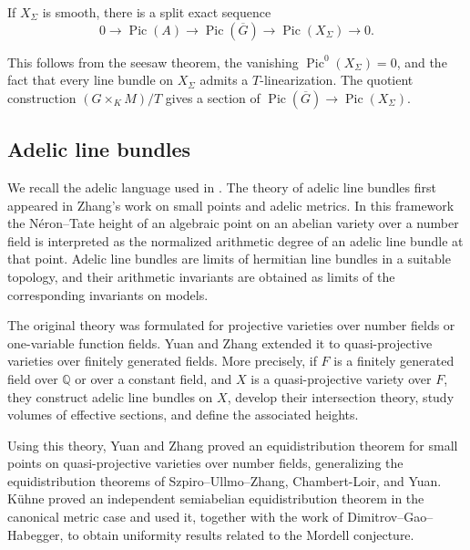 \documentclass[10pt,a4paper]{amsart}
\theoremstyle{plain}
\theoremstyle{plain}
\numberwithin{equation}{section}
\begin{document}
\begin{prop}
	If \(X_\Sigma\) is smooth, there is a split exact sequence
	\[
	0\longrightarrow \operatorname{Pic}(A)
	\longrightarrow \operatorname{Pic}(\overline G)
	\longrightarrow \operatorname{Pic}(X_\Sigma)
	\longrightarrow 0.
	\]
\end{prop}
This follows from the seesaw theorem, the vanishing
\(\operatorname{Pic}^0(X_\Sigma)=0\), and the fact that every line bundle on
\(X_\Sigma\) admits a \(T\)-linearization.  The quotient construction
\((G\times_K M)/T\) gives a section of
\(\operatorname{Pic}(\overline G)\to\operatorname{Pic}(X_\Sigma)\).
\subsection{Adelic line bundles}


We recall the adelic language used in \cite{YZ}.  The theory of adelic line
bundles first appeared in Zhang's work on small points and adelic metrics.  In
this framework the N\'eron--Tate height of an algebraic point on an abelian
variety over a number field is interpreted as the normalized arithmetic degree
of an adelic line bundle at that point.  Adelic line bundles are limits of
hermitian line bundles in a suitable topology, and their arithmetic invariants
are obtained as limits of the corresponding invariants on models.

The original theory was formulated for projective varieties over number fields
or one-variable function fields.  Yuan and Zhang extended it to
quasi-projective varieties over finitely generated fields.  More precisely, if
\(F\) is a finitely generated field over \(\mathbb Q\) or over a constant
field, and \(X\) is a quasi-projective variety over \(F\), they construct
adelic line bundles on \(X\), develop their intersection theory, study volumes
of effective sections, and define the associated heights.


Using this theory, Yuan and Zhang proved an equidistribution theorem for small points on quasi-projective varieties over number fields, generalizing the equidistribution theorems of Szpiro--Ullmo--Zhang, Chambert-Loir, and Yuan.  K\"uhne proved an independent semiabelian equidistribution theorem in the canonical metric case and used it, together with the work of Dimitrov--Gao--Habegger, to obtain uniformity results related to the Mordell conjecture.
\end{document}
